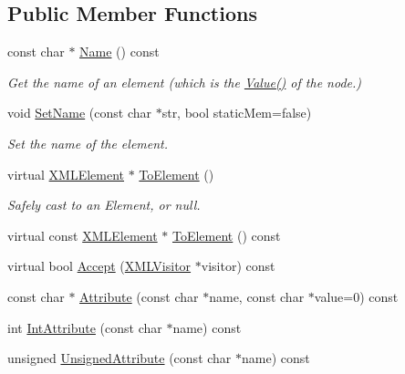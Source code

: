 \subsection*{Public Member Functions}
\begin{DoxyCompactItemize}
\item 
const char $\ast$ \hyperlink{classtinyxml2_1_1_x_m_l_element_a8bff355472bce2c60d4b50a212bf7f5f}{Name} () const 
\begin{DoxyCompactList}\small\item\em Get the name of an element (which is the \hyperlink{classtinyxml2_1_1_x_m_l_node_a92835c779871918f9af569bfe9669fe6}{Value()} of the node.) \end{DoxyCompactList}\item 
void \hyperlink{classtinyxml2_1_1_x_m_l_element_a97712009a530d8cb8a63bf705f02b4f1}{Set\+Name} (const char $\ast$str, bool static\+Mem=false)
\begin{DoxyCompactList}\small\item\em Set the name of the element. \end{DoxyCompactList}\item 
virtual \hyperlink{classtinyxml2_1_1_x_m_l_element}{X\+M\+L\+Element} $\ast$ \hyperlink{classtinyxml2_1_1_x_m_l_element_ad9ff5c2dbc15df36cf664ce1b0ea0a5d}{To\+Element} ()
\begin{DoxyCompactList}\small\item\em Safely cast to an Element, or null. \end{DoxyCompactList}\item 
virtual const \hyperlink{classtinyxml2_1_1_x_m_l_element}{X\+M\+L\+Element} $\ast$ \hyperlink{classtinyxml2_1_1_x_m_l_element_a55acab615353ddabab48271f95816b0d}{To\+Element} () const 
\item 
virtual bool \hyperlink{classtinyxml2_1_1_x_m_l_element_a36d65438991a1e85096caf39ad13a099}{Accept} (\hyperlink{classtinyxml2_1_1_x_m_l_visitor}{X\+M\+L\+Visitor} $\ast$visitor) const 
\item 
const char $\ast$ \hyperlink{classtinyxml2_1_1_x_m_l_element_a7bdebdf1888074087237f3dd03912740}{Attribute} (const char $\ast$name, const char $\ast$value=0) const 
\item 
int \hyperlink{classtinyxml2_1_1_x_m_l_element_af86f05771c11a73a2896b662bb589ef5}{Int\+Attribute} (const char $\ast$name) const 
\item 
unsigned \hyperlink{classtinyxml2_1_1_x_m_l_element_aa5a41367b5118acec42a87f5f94cec2d}{Unsigned\+Attribute} (const char $\ast$name) const 

\end{DoxyCompactItemize}
